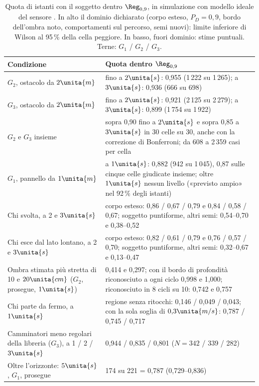 \begin{table}[H]\centering\footnotesize
\caption{Quota di istanti con il soggetto dentro $\Reg_{0,9}$, in simulazione con modello ideale del sensore . In alto il dominio dichiarato (corpo esteso, $P_D=0{,}9$, bordo dell'ombra noto, comportamenti sul percorso, semi nuovi): limite inferiore di Wilson al 95\,\% della cella peggiore. In basso, fuori dominio: stime puntuali. Terne: $G_1$ / $G_2$ / $G_3$.}\label{tab:occ-dominio}
\begin{tabularx}{\linewidth}{>{\RaggedRight\arraybackslash}p{4.3cm} L}
\toprule
Condizione & Quota dentro $\Reg_{0,9}$\\
\midrule
$G_2$, ostacolo da $2\unita{m}$ & fino a $2\unita{s}$: 0,955 (1\,222 su 1\,265); a $3\unita{s}$: 0,936 (666 su 698)\\
$G_3$, ostacolo da $2\unita{m}$ & fino a $2\unita{s}$: 0,921 (2\,125 su 2\,279); a $3\unita{s}$: 0,899 (1\,754 su 1\,922)\\
$G_2$ e $G_3$ insieme & sopra 0,90 fino a $2\unita{s}$ e sopra 0,85 a $3\unita{s}$ in 30 celle su 30, anche con la correzione di Bonferroni; da 608 a 2\,359 casi per cella\\
$G_1$, pannello da $1\unita{m}$ & a $1\unita{s}$: 0,882 (942 su 1\,045), 0,87 sulle cinque celle giudicate insieme; oltre $1\unita{s}$ nessun livello («previsto ampio» nel 92\,\% degli istanti)\\
\midrule
Chi svolta, a 2 e $3\unita{s}$ & corpo esteso: 0,86 / 0,67 / 0,79 e 0,84 / 0,58 / 0,67; soggetto puntiforme, altri semi: 0,54--0,70 e 0,38--0,52\\
Chi esce dal lato lontano, a 2 e $3\unita{s}$ & corpo esteso: 0,82 / 0,61 / 0,79 e 0,76 / 0,57 / 0,70; soggetto puntiforme, altri semi: 0,32--0,67 e 0,13--0,47\\
Ombra stimata più stretta di 10 e $20\unita{cm}$ ($G_2$, prosegue, $1\unita{s}$) & 0,414 e 0,297; con il bordo di profondità riconosciuto a ogni ciclo 0,998 e 1,000; riconosciuto in 8 cicli su 10: 0,742 e 0,757\\
Chi parte da fermo, a $1\unita{s}$ & regione senza ritocchi: 0,146 / 0,049 / 0,043; con la sola soglia di $0{,}3\unita{m/s}$: 0,787 / 0,745 / 0,717\\
Camminatori meno regolari della libreria ($G_3$), a 1 / 2 / $3\unita{s}$ & 0,944 / 0,835 / 0,801 ($N=342$ / 339 / 282)\\
Oltre l'orizzonte: $5\unita{s}$, $G_1$, prosegue & 174 su 221 = 0,787 (0,729--0,836)\\
\bottomrule
\end{tabularx}
\end{table}

